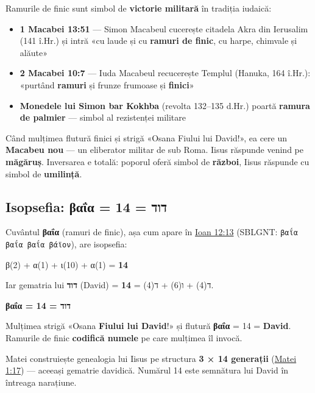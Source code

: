 \documentclass[12pt,a4paper,twoside,openany]{book}
\begin{document}
Ramurile de finic sunt simbol de \textbf{victorie militară} în tradiția iudaică:

\begin{itemize}
  \item \textbf{1 Macabei 13:51} — Simon Macabeul cucerește citadela Akra din Ierusalim (141 î.Hr.) și intră «cu laude și cu \textbf{ramuri de finic}, cu harpe, chimvale și alăute»
  \item \textbf{2 Macabei 10:7} — Iuda Macabeul recucerește Templul (Hanuka, 164 î.Hr.): «purtând \textbf{ramuri} și frunze frumoase și \textbf{finici}»
  \item \textbf{Monedele lui Simon bar Kokhba} (revolta 132--135 d.Hr.) poartă \textbf{ramura de palmier} — simbol al rezistenței militare
\end{itemize}

Când mulțimea flutură finici și strigă «Osana Fiului lui David!», ea cere un \textbf{Macabeu nou} — un eliberator militar de sub Roma. Iisus răspunde venind pe \textbf{măgăruș}. Inversarea e totală: poporul oferă simbol de \textbf{război}, Iisus răspunde cu simbol de \textbf{umilință}.

\subsection{Isopsefia: βαΐα = 14 = דוד}

Cuvântul \textbf{βαΐα} (ramuri de finic), așa cum apare în \href{https://bibliaortodoxa.ro/carte.php?id=35\&cap=12\#13}{Ioan 12:13} (SBLGNT: \texttt{βαΐα βαΐα βαΐα βάϊον}), are isopsefia:

\begin{center}
β(2) + α(1) + ι(10) + α(1) = \textbf{14}
\end{center}

Iar gematria lui \textbf{דוד} (David) = ד(4) + ו(6) + ד(4) = \textbf{14}.

\begin{center}
\large\bfseries βαΐα = 14 = דוד
\end{center}

Mulțimea strigă «Osana \textbf{Fiului lui David}!» și flutură \textbf{βαΐα} = 14 = \textbf{David}. Ramurile de finic \textbf{codifică numele} pe care mulțimea îl invocă.

Matei construiește genealogia lui Iisus pe structura \textbf{3 × 14 generații} (\href{https://bibliaortodoxa.ro/carte.php?id=55\&cap=1\#17}{Matei 1:17}) — aceeași gematrie davidică. Numărul 14 este semnătura lui David în întreaga narațiune.
\end{document}
